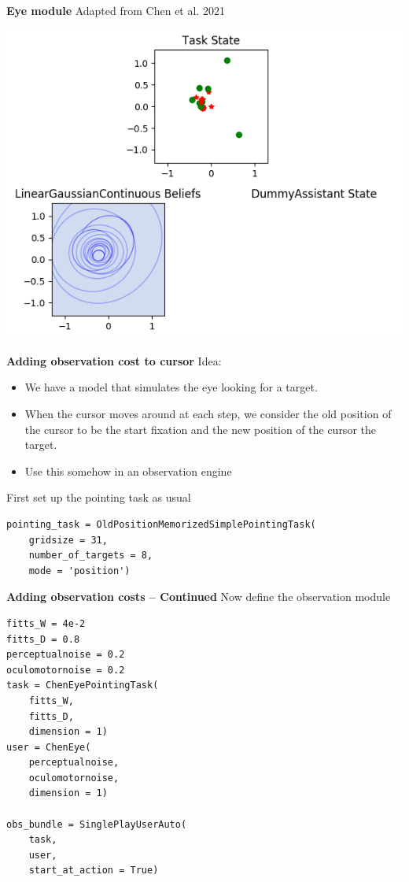 \documentclass[11pt, xcolor = {dvipsnames}]{beamer}
\begin{document}
\begin{frame}{\textbf{Eye module}}
Adapted from Chen et al. 2021

\centering
\includegraphics[width=.8\textwidth]{fig/eye.png} 
\end{frame}

\begin{frame}[fragile]{\textbf{Adding observation cost to cursor}}
Idea:
\begin{itemize}
\item We have a model that simulates the eye looking for a target.
\item When the cursor moves around at each step, we consider the old position of the cursor to be the start fixation and the new position of the cursor the target.
\item Use this somehow in an observation engine
\end{itemize}

First set up the pointing task as usual

\begin{adjustbox}{width=.95\textwidth}
\lstset{language=Python}
\lstset{frame=lines}
\lstset{basicstyle=\footnotesize}
\begin{lstlisting}
pointing_task = OldPositionMemorizedSimplePointingTask(
	gridsize = 31, 
	number_of_targets = 8, 
	mode = 'position')
\end{lstlisting}
\end{adjustbox}
\end{frame}

\begin{frame}[fragile]{\textbf{Adding observation costs -- Continued}}
Now define the observation module


\begin{adjustbox}{width=.5\textwidth}
\lstset{language=Python}
\lstset{frame=lines}
\lstset{basicstyle=\footnotesize}
\begin{lstlisting}
fitts_W = 4e-2
fitts_D = 0.8
perceptualnoise = 0.2
oculomotornoise = 0.2
task = ChenEyePointingTask(
	fitts_W, 
	fitts_D, 
	dimension = 1)
user = ChenEye( 
	perceptualnoise, 
	oculomotornoise, 
	dimension = 1)
	
obs_bundle = SinglePlayUserAuto(
	task, 
	user, 
	start_at_action = True)
\end{lstlisting}
\end{adjustbox}
\end{frame}
\end{document}
